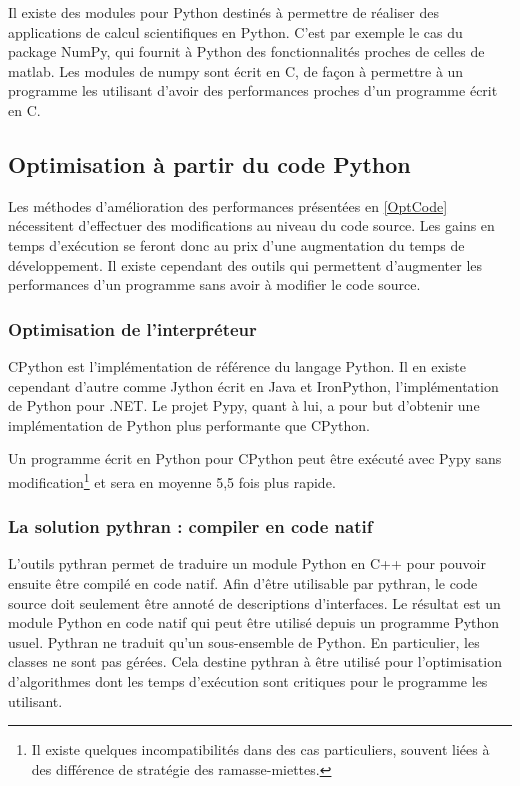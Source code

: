 \documentclass[a4paper]{article}
\begin{document}
Il existe des modules pour Python destinés à permettre de réaliser des
applications de calcul scientifiques en Python.  C'est par exemple le
cas du package NumPy, qui fournit à Python des fonctionnalités proches
de celles de matlab. Les modules de numpy sont écrit en C, de façon à
permettre à un programme les utilisant d'avoir des performances
proches d'un programme écrit en C\cite{NumPyPerf}.

\subsection{Optimisation à partir du code Python}

Les méthodes d'amélioration des performances présentées en
\ref{OptCode} nécessitent d'effectuer des modifications au niveau du
code source. Les gains en temps d'exécution se feront donc au prix
d'une augmentation du temps de développement. Il existe cependant des
outils qui permettent d'augmenter les performances d'un programme sans
avoir à modifier le code source.

\subsubsection{Optimisation de l'interpréteur}

CPython est l'implémentation de référence du langage Python. Il en
existe cependant d'autre comme Jython écrit en Java et IronPython,
l'implémentation de Python pour .NET. Le projet Pypy, quant à lui, a
pour but d'obtenir une implémentation de Python plus performante que
CPython.

Un programme écrit en Python pour CPython peut être exécuté avec Pypy
sans modification\footnote{Il existe quelques incompatibilités dans
  des cas particuliers, souvent liées à des différence de stratégie
  des ramasse-miettes\cite{PypyDiff}.} et sera en moyenne 5,5 fois
plus rapide\cite{PypySpeed}.

\subsubsection{La solution pythran : compiler en code natif}

L'outils pythran permet de traduire un module Python en C++ pour
pouvoir ensuite être compilé en code natif. Afin d'être utilisable par
pythran, le code source doit seulement être annoté de descriptions
d'interfaces. Le résultat est un module Python en code natif qui peut
être utilisé depuis un programme Python usuel. Pythran ne traduit
qu'un sous-ensemble de Python. En particulier, les classes ne sont pas
gérées. Cela destine pythran à être utilisé pour l'optimisation
d'algorithmes dont les temps d'exécution sont critiques pour le
programme les utilisant.
\end{document}
